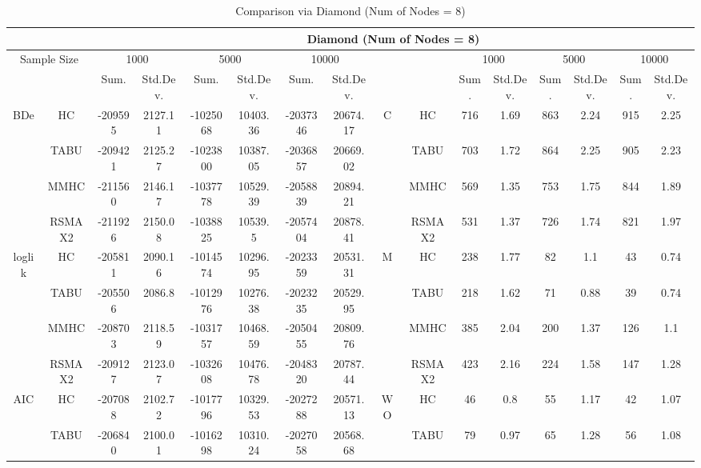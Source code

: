 \begin{table}[p]																										
\centering	\caption{Comparison via Diamond (Num of Nodes = 8)}	\tiny																						
{\tabcolsep=0.01in																										
\begin{tabular}{cc||cc|cc|cc||cc|cc|cc|cc}																										
\hline																										
&	&	\multicolumn{14}{c}{Diamond	(Num	of	Nodes	=	8)}\tabularnewline																			
\hline																										
\multicolumn{2}{c||}{Sample	Size}	&	\multicolumn{2}{c|}{1000}	&	\multicolumn{2}{c|}{5000}	&	\multicolumn{2}{c||}{10000}	&	&	&	\multicolumn{2}{c|}{1000}	&	\multicolumn{2}{c|}{5000}	&	\multicolumn{2}{c}{10000}\tabularnewline											
\hline																										
&	&	Sum.	&	Std.Dev.	&	Sum.	&	Std.Dev.	&	Sum.	&	Std.Dev.	&	&	&	Sum.	&	Std.Dev.	&	Sum.	&	Std.Dev.	&	Sum.	&	Std.Dev.\tabularnewline
\hline																										
\hline																										
\multirow{4}{*}{BDe} & HC &	-209595 & 	2127.11 & 	-1025068 & 	10403.36 & 	-2037346 & 	20674.17 & 	\multirow{4}{*}{C} & HC &	716 & 	1.69 & 	863 & 	2.24 & 	915 & 	2.25\tabularnewline													
& TABU &	-209421 & 	2125.27 & 	-1023800 & 	10387.05 & 	-2036857 & 	20669.02 & 	& TABU &	703 & 	1.72 & 	864 & 	2.25 & 	905 & 	2.23\tabularnewline													
& MMHC &	-211560 & 	2146.17 & 	-1037778 & 	10529.39 & 	-2058839 & 	20894.21 & 	& MMHC &	569 & 	1.35 & 	753 & 	1.75 & 	844 & 	1.89\tabularnewline													
& RSMAX2 &	-211926 & 	2150.08 & 	-1038825 & 	10539.5 & 	-2057404 & 	20878.41 & 	& RSMAX2 &	531 & 	1.37 & 	726 & 	1.74 & 	821 & 	1.97\tabularnewline													
\hline																										
\multirow{4}{*}{loglik} & HC &	-205811 & 	2090.16 & 	-1014574 & 	10296.95 & 	-2023359 & 	20531.31 & 	\multirow{4}{*}{M} & HC &	238 & 	1.77 & 	82 & 	1.1 & 	43 & 	0.74\tabularnewline													
& TABU &	-205506 & 	2086.8 & 	-1012976 & 	10276.38 & 	-2023235 & 	20529.95 & 	& TABU &	218 & 	1.62 & 	71 & 	0.88 & 	39 & 	0.74\tabularnewline													
& MMHC &	-208703 & 	2118.59 & 	-1031757 & 	10468.59 & 	-2050455 & 	20809.76 & 	& MMHC &	385 & 	2.04 & 	200 & 	1.37 & 	126 & 	1.1\tabularnewline													
& RSMAX2 &	-209127 & 	2123.07 & 	-1032608 & 	10476.78 & 	-2048320 & 	20787.44 & 	& RSMAX2 &	423 & 	2.16 & 	224 & 	1.58 & 	147 & 	1.28\tabularnewline													
\hline																										
\multirow{4}{*}{AIC} & HC &	-207088 & 	2102.72 & 	-1017796 & 	10329.53 & 	-2027288 & 	20571.13 & 	\multirow{4}{*}{WO} & HC &	46 & 	0.8 & 	55 & 	1.17 & 	42 & 	1.07\tabularnewline													
& TABU &	-206840 & 	2100.01 & 	-1016298 & 	10310.24 & 	-2027058 & 	20568.68 & 	& TABU &	79 & 	0.97 & 	65 & 	1.28 & 	56 & 	1.08\tabularnewline													

\end{tabular}}
\end{table}
